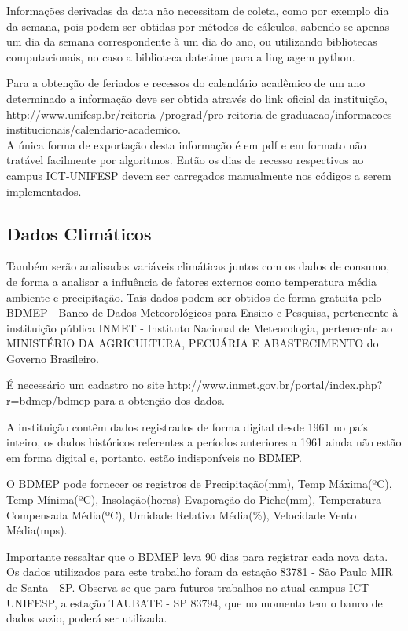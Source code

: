 \documentclass[	12pt, Times, openright, twoside, a4paper, english, brazil]{abntex2}
\begin{document}
	Informações derivadas da data não necessitam de coleta, como por exemplo dia da semana, pois podem ser obtidas por métodos de cálculos, sabendo-se apenas um dia da semana correspondente à um dia do ano, ou utilizando bibliotecas computacionais, no caso a biblioteca datetime para a linguagem python.
	
	Para a obtenção de feriados e recessos do calendário acadêmico de um ano determinado a informação deve ser obtida através do link oficial da instituição, http://www.unifesp.br/reitoria /prograd/pro-reitoria-de-graduacao/informacoes-institucionais/calendario-academico.\\ A única forma de exportação desta informação é em pdf e em formato não tratável facilmente por algoritmos. Então os dias de recesso respectivos ao campus ICT-UNIFESP devem ser carregados manualmente nos códigos a serem implementados.
		 
	
	\subsection{Dados Climáticos}
	Também serão analisadas variáveis climáticas juntos com os dados de consumo, de forma a analisar a influência de fatores externos como temperatura média ambiente e precipitação. Tais dados podem ser obtidos de forma gratuita pelo BDMEP - Banco de Dados Meteorológicos para Ensino e Pesquisa, pertencente à instituição pública INMET - Instituto Nacional de Meteorologia, pertencente ao MINISTÉRIO DA AGRICULTURA, PECUÁRIA E ABASTECIMENTO do Governo Brasileiro. 
	
	É necessário um cadastro no site http://www.inmet.gov.br/portal/index.php?r=bdmep/bdmep para a obtenção dos dados. 
	
	A instituição contêm dados registrados de forma digital desde 1961 no país inteiro, os dados históricos referentes a períodos anteriores a 1961 ainda não estão em forma digital e, portanto, estão indisponíveis no BDMEP.
	
	O BDMEP pode fornecer os registros de Precipitação(mm), Temp Máxima(ºC), Temp Mínima(ºC), Insolação(horas)
	Evaporação do Piche(mm), Temperatura Compensada Média(ºC), Umidade Relativa Média(\%), Velocidade Vento Média(mps).
	
	Importante ressaltar que o BDMEP leva 90 dias para registrar cada nova data.
	Os dados utilizados para este trabalho foram da estação 83781 - São Paulo MIR de Santa - SP.
	Observa-se que para futuros trabalhos no atual campus ICT-UNIFESP, a estação TAUBATE - SP 83794, que no momento tem o banco de dados vazio, poderá ser utilizada.
	
\end{document}
